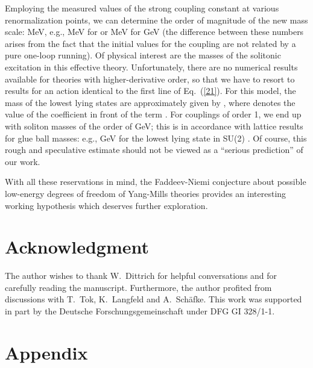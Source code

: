\documentclass[a4paper,12pt]{article}
\providecommand{\re}[1]{~(\ref{#1})}\usepackage{useful_macros}
\begin{document}
Employing the measured values of the strong coupling constant at
various renormalization points, we can determine the order of
magnitude of the new mass scale: \coordHE{}MeV,
e.g., \coordHE{}MeV for \coordHE{} or
\coordHE{}MeV for \coordHE{}GeV\coordHE{} (the difference
between these numbers arises from the fact that the initial values for
the coupling are not related by a pure one-loop running). Of physical
interest are the masses of the solitonic excitation in this effective
theory. Unfortunately, there are no numerical results available for
theories with higher-derivative order, so that we have to resort to
results for an action identical to the first line of Eq.\re{21}. For
this model, the mass of the lowest lying states are approximately
given by \coordHE{}, where \coordHE{} denotes the
value of the coefficient in front of the
\coordHE{} term
\cite{Gladikowski:1997mb,Battye:1999zn}. For couplings of order 1, we
end up with soliton masses of the order of \coordHE{}GeV; this
is in accordance with lattice results for glue ball masses: e.g., 
\coordHE{}GeV for the lowest lying state in SU(2)
\cite{Teper:1998kw}. Of course, this rough and speculative estimate
should not be viewed as a ``serious prediction'' of our work.

With all these reservations in mind, the Faddeev-Niemi conjecture
about possible low-energy degrees of freedom of Yang-Mills theories
provides an interesting working hypothesis which deserves further
exploration. 

\section*{Acknowledgment}

The author wishes to thank W.~Dittrich for helpful conversations and
for carefully reading the manuscript. Furthermore, the author
profited from discussions with T.~Tok, K.~Langfeld and
A.~Sch\"afke. This work was supported in part by the Deutsche
Forschungsgemeinschaft under DFG GI 328/1-1.  


\section*{Appendix}
\end{document}
